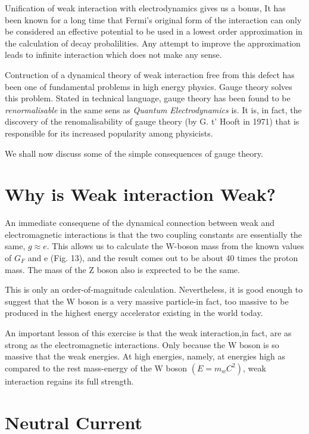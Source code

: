 Unification of weak interaction with electrodynamics gives us a bonus,  It has been known for a long time that Fermi's original form of the interaction can only be considered an effective potential to be used in a lowest order approximation in the calculation of decay probalilities. Any attempt to improve the approximation leads to infinite interaction which does not make any sense.

Contruction of a dynamical theory of weak interaction free from this defect has been one of fundamental problems in high energy physics. Gauge theory solves this problem. Stated in technical language, gauge theory has been found to be {\it renormalisable} in the same sens as {\it Quantum Electrodynamics} is. It is, in fact, the discovery of the renomalisability of gauge theory (by G. t' Hooft in 1971) that is responsible for its increased popularity among physicists. 

We shall now discuss some of the simple consequences of gauge theory.

\section*{Why is Weak interaction Weak?}

An immediate consequene of the dynamical connection between weak and electromagnetic interactions is that the two coupling constants are essentially the same, $g\approx e$. This allows us to calculate the W-boson mass from the known values of $G_{F}$ and e (Fig. 13), and the result comes out to be about 40 times the proton mass. The mass of the Z boson also is exprected to be the same.

This is only an order-of-magnitude calculation. Nevertheless, it is good enough to suggest that the W boson is a very massive particle-in fact, too massive to be produced in the highest energy accelerator existing in the world today.

An important lesson of this exercise is that the weak interaction,in fact, are as strong as the electromagnetic interactions. Only because the W boson is so massive that the weak energies. At high energies, namely, at energies high as compared to the rest mass-energy of the W boson $(E = m_{w}C^{2})$, weak interaction regains its full strength.

\section*{Neutral Current}

